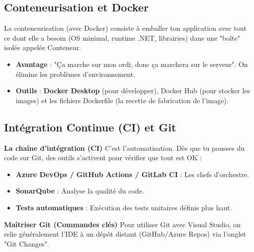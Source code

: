 \newpage
    
\subsection*{Conteneurisation et Docker}
{}
\noindent La conteneurisation (avec Docker) consiste à emballer ton application avec tout ce dont elle a besoin (OS minimal, runtime .NET, librairies) dans une "boîte" isolée appelée Conteneur.

\begin{itemize}
	\item \textbf{Avantage} : "Ça marche sur mon ordi, donc ça marchera sur le serveur". On élimine les problèmes d'environnement.
	\item \textbf{Outils} : \textbf{Docker Desktop} (pour développer), Docker Hub (pour stocker les images) et les fichiers Dockerfile (la recette de fabrication de l'image).
\end{itemize}

\vspace{0.5cm}

\subsection*{Intégration Continue (CI) et Git}
{}
\noindent \textbf{La chaîne d'intégration (CI)}
\noindent C'est l'automatisation. Dès que tu pousses du code sur Git, des outils s'activent pour vérifier que tout est OK :

\begin{itemize}
	\item \textbf{Azure DevOps / GitHub Actions / GitLab CI} : Les chefs d'orchestre.
	\item \textbf{SonarQube} : Analyse la qualité du code.
	\item \textbf{Tests automatiques} : Exécution des tests unitaires définis plus haut.
\end{itemize}

\noindent \textbf{Maîtriser Git (Commandes clés)}
\noindent Pour utiliser Git avec Visual Studio, on relie généralement l'IDE à un dépôt distant (GitHub/Azure Repos) via l'onglet "Git Changes".

\vspace{0.5cm}


